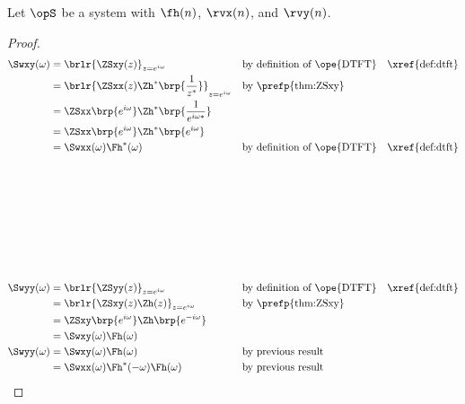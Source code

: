 \begin{corollary}
\label{cor:Swxy}
Let $\opS$ be a system with  $\fh(n)$,
 $\rvx(n)$, and  $\rvy(n)$.
\end{corollary}
\begin{proof}
\begin{align*}
   \Swxy(\omega)
     &= \brlr{\ZSxy(z)}_{z=e^{i\omega}}
     && \text{by definition of \ope{DTFT}}
     && \text{\xref{def:dtft}}
   \\&= \brlr{\ZSxx(z)\Zh^\ast\brp{\frac{1}{z^\ast}}}_{z=e^{i\omega}}
     && \text{by \prefp{thm:ZSxy}}
   \\&= \ZSxx\brp{e^{i\omega}}\Zh^\ast\brp{\frac{1}{e^{i\omega\ast}}}
   \\&= \ZSxx\brp{e^{i\omega}}\Zh^\ast\brp{e^{i\omega}}
   \\&= \Swxx(\omega) \Fh^\ast(\omega)
     && \text{by definition of \ope{DTFT}}
     && \text{\xref{def:dtft}}
   \\
   \\
   \\
   \\
   \\
   \\
   \\
   \\
   \\
   \Swyy(\omega)
     &= \brlr{\ZSyy(z)}_{z=e^{i\omega}}
     && \text{by definition of \ope{DTFT}}
     && \text{\xref{def:dtft}}
   \\&= \brlr{\ZSxy(z)\Zh(z)}_{z=e^{i\omega}}
     && \text{by \prefp{thm:ZSxy}}
   \\&= \ZSxy\brp{e^{i\omega}}\Zh\brp{e^{-i\omega}}
   \\&= \Swxy(\omega) \Fh(\omega)
   \\
   \Swyy(\omega)
     &= \Swxy(\omega) \Fh(\omega)
     && \text{by previous result}
   \\&= \Swxx(\omega) \Fh^\ast(-\omega) \Fh(\omega)
     && \text{by previous result}
\end{align*}
\end{proof}

